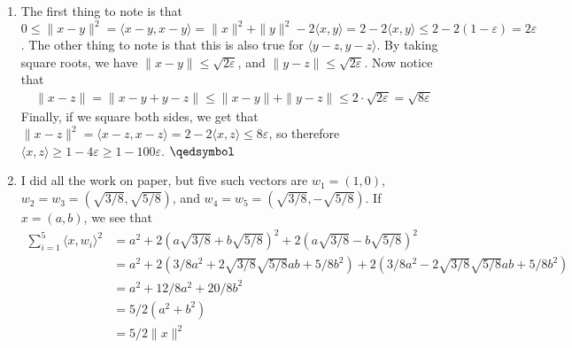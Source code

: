 \documentclass[12pt]{article}
\theoremstyle{definition}
\theoremstyle{remark}
\newcommand{\R}{\mathbb{R}}
\renewcommand{\ip}[2]{\langle #1, #2 \rangle}
\newcommand{\mg}[1]{\| #1 \|}
\newcommand{\ve}{\varepsilon}
\renewcommand{\leq}{\leqslant}
\renewcommand{\geq}{\geqslant}
\begin{document}
\begin{enumerate}[leftmargin=\labelsep]
		Finally, note that $\bigcap_{k=1}^{\infty} \qty(-\frac1k, \frac1k) = \{0\}$.
		\begin{proof}
			$\\$\fbox{$\subseteq$}
			
			Let $k>1$. Then $-\frac1k < 0 < \frac1k$, so $0 \in \bigcap_{k=1}^{\infty} \qty(-\frac1k, \frac1k)$. 
			
			\fbox{$\supseteq$}
			
			Suppose by way of contradiction that $\bigcap_{k=1}^{\infty} \qty(-\frac1k, \frac1k)$ contained something nonzero, say $b$. Then $-\frac1k < b < \frac1k$ for all $k > 1$. Now choose $k \geq \frac1b$, and note that $\frac1k \leq b$, a contradiction.
		\end{proof}
		 Clearly $\{0\}$ is closed because the boundary of $\R - \{0\}$ is just $\{0\}$, so $\{0\}$ equals its closure. This is an example of an infinite intersection of open sets not being open.
		
		A set that is neither closed or open is $(0, 1]$, because this set contains half of its boundary (it contains 1, but not 0).
		
		\item
		The first thing to note is that $0 \leq \mg{x-y}^2 = \ip{x-y}{x-y} = \mg{x}^2+\mg{y}^2-2\ip{x}{y} = 2-2\ip{x}{y} \leq 2-2(1-\ve) = 2\ve$. The other thing to note is that this is also true for $\ip{y-z}{y-z}$. By taking square roots, we have $\mg{x-y} \leq \sqrt{2\ve}$, and $\mg{y-z} \leq \sqrt{2\ve}$. Now notice that 
		\begin{align*}
			\mg{x-z} = \mg{x-y+y-z} \leq \mg{x-y}+\mg{y-z} \leq 2\cdot \sqrt{2\ve} = \sqrt{8\ve}
		\end{align*}
		Finally, if we square both sides, we get that $\mg{x-z}^2 = \ip{x-z}{x-z} = 2-2\ip{x}{z} \leq 8\ve$, so therefore $\ip{x}{z} \geq 1-4\ve \geq 1-100\ve$. $\hfill \qedsymbol$
		
		\item 
		I did all the work on paper, but five such vectors are $w_1 = (1, 0)$, $w_2 = w_3 = (\sqrt{3/8}, \sqrt{5/8})$, and $w_4=w_5=(\sqrt{3/8}, -\sqrt{5/8})$. If $x = (a, b)$, we see that
		\begin{align*}
			\sum_{i=1}^{5}\ip{x}{w_i}^2 &= a^2+2(a\sqrt{3/8}+b\sqrt{5/8})^2+2(a\sqrt{3/8}-b\sqrt{5/8})^2 \\
			&= a^2+2(3/8a^2+2\sqrt{3/8}\sqrt{5/8}ab+5/8b^2)+2(3/8a^2-2\sqrt{3/8}\sqrt{5/8}ab+5/8b^2) \\
			&= a^2+12/8a^2 + 20/8b^2 \\
			&= 5/2(a^2+b^2) \\
			&= 5/2\mg{x}^2 \\
		\end{align*}
		

\end{enumerate}
\end{document}
